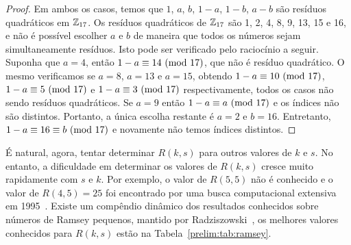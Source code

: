\begin{proof}
Em ambos os casos, temos que $1$, $a$, $b$, $1 - a$, $1- b$, $a - b$ são resíduos quadráticos em $\mathbb{Z}_{17}$. Os resíduos quadráticos de $\mathbb{Z}_{17}$ são 1, 2, 4, 8, 9, 13, 15 e 16, e não é possível escolher $a$ e $b$ de maneira que todos os números sejam simultaneamente resíduos. Isto pode ser verificado pelo raciocínio a seguir. Suponha que $a = 4$, então $1 - a \equiv 14 \ (\text{mod}\ 17)$, que não é resíduo quadrático.
O mesmo verificamos se $a = 8$, $a = 13$ e $a = 15$, obtendo $1 - a \equiv 10 \ (\text{mod}\ 17)$, $1 - a \equiv 5 \ (\text{mod}\ 17)$ e $1 - a \equiv 3 \ (\text{mod}\ 17)$ respectivamente, todos os casos não sendo resíduos quadráticos. Se $a = 9$ então $1 - a \equiv a \ (\text{mod}\ 17)$ e os índices não são distintos.
Portanto, a única escolha restante é $a = 2$ e $b = 16$. Entretanto, $1 - a \equiv 16 \equiv b \ (\text{mod}\ 17)$ e novamente não temos índices distintos.
\end{proof}

É natural, agora, tentar determinar $R(k,s)$ para outros valores de $k$ e $s$. No entanto, a dificuldade em determinar os valores de $R(k,s)$ cresce muito rapidamente com $s$ e $k$. Por exemplo, o valor de $R(5,5)$ não é conhecido e o valor de $R(4,5) = 25$ foi encontrado por uma busca computacional extensiva em 1995~\cite{rad45}. Existe um compêndio dinâmico dos resultados conhecidos sobre números de Ramsey pequenos, mantido por Radziszowski~\cite{small_ramsey}, os melhores valores conhecidos para $R(k,s)$ estão na Tabela~\ref{prelim:tab:ramsey}.

